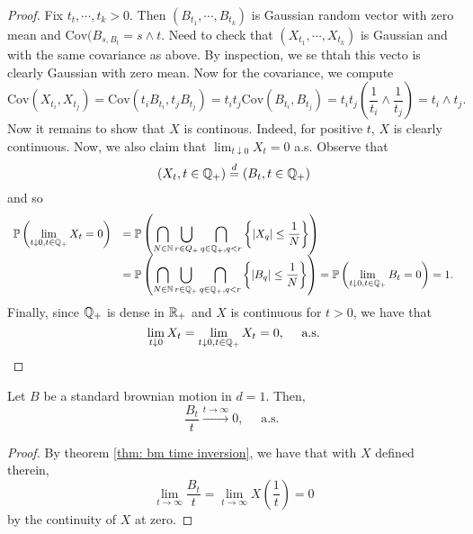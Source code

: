 \documentclass{article}
\begin{document}
\begin{proof}
    Fix $ t_{t}, \cdots ,t_{k}>0$. Then $ (B_{t_{1}}, \cdots, B_{t_{k}})$ is  Gaussian random vector with zero mean and $ \text{Cov}(B_{s, B_{t}}= s\land t$. Need to check that $ (X_{t_{1}}, \cdots, X_{t_{k}})$ is Gaussian and with the same covariance as above. By inspection, we se thtah this vecto is clearly Gaussian with zero mean. Now for the covariance, we compute
    \[
    \text{Cov}(X_{t_{i}}, X_{t_{j}}) = \text{Cov}(t_{i}B_{t_{i}}, t_{j}B_{t_{j}}) = t_{i}t_{j}\text{Cov}(B_{t_{i}}, B_{t_{j}}) = t_{i}t_{j} \left( \frac{1}{t_{i}}\land \frac{1}{t_{j}} \right) = t_{i}\land t_{j}.
    \]
   Now it remains to show that $ X$ is continous. Indeed, for positive $ t$, $ X$ is clearly continuous. Now, we also claim that $ \lim_{t\downarrow 0} X_{t} = 0$ a.s. Observe that 
   \[
	   (X_{t}, t\in \mathbb{Q}_{+}) \stackrel{d}{=} (B_{t}, t\in \mathbb{Q}_{+})
   \]
   and so 
\[
\begin{array}{ll}
     
	\mathbb{P} \left( \displaystyle\lim_{t\downarrow 0, t\in \mathbb{Q}_{+}}X_{t} = 0  \right) &=  \mathbb{P} \left( \displaystyle\bigcap_{N\in \mathbb{N}} \displaystyle\bigcup_{r\in Q_{+}} \displaystyle\bigcap_{q\in \mathbb{Q}_{+}, q< r} \left\{|X_{q}|\leq \frac{1}{N}\right\}  \right)\\ 
								       &= \mathbb{P} \left( \displaystyle\bigcap_{N\in \mathbb{N}} \displaystyle\bigcup_{r\in \mathbb{Q}_{+}} \displaystyle\bigcap_{q\in \mathbb{Q}_{+}, q< r} \left\{|B_{q}|\leq \frac{1}{N}\right\}  \right) = \mathbb{P} \left( \displaystyle\lim_{t\downarrow 0, t\in \mathbb{Q}_{+}}B_{t} = 0  \right) = 1.
\end{array}
\]
Finally, since $ \mathbb{Q}_{+}$ is dense in $ \mathbb{R}_{+}
$ and $ X$ is continuous for $ t> 0$, we have that 
\[
\displaystyle\lim_{t\downarrow 0}X_{t} = \displaystyle\lim_{t\downarrow 0, t\in \mathbb{Q}_{+}}X_{t} = 0, \quad \text{ a.s.}
\] 
\end{proof}



\begin{boxcor}\label{cor: bm time inversion}
Let $ B$ be a standard brownian motion in $ d =1$. Then, 
\[
 \frac{B_{t}}{t}\stackrel{t\to \infty}{\longrightarrow}0,  \quad \text{ a.s. }
\]

\end{boxcor}

\begin{proof}

	By theorem \ref{thm: bm time inversion}, we have that with $ X$ defined therein,
	\[
	\displaystyle\lim_{t\to \infty}\frac{B_{t}}{t} = \displaystyle\lim_{t\to \infty}X \left( \frac{1}{t} \right) = 0
\]
by the continuity of $ X$ at zero.
\end{proof}
\end{document}
